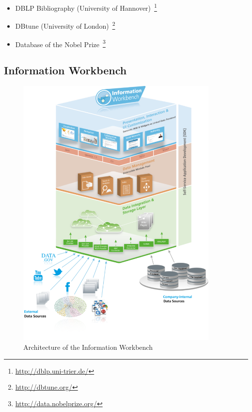 \begin{itemize}
\itemsep0pt
\item DBLP Bibliography (University of Hannover)~\footnote{\url{http://dblp.uni-trier.de/}}
\item DBtune (University of London)~\footnote{\url{http://dbtune.org/}}
\item Database of the Nobel Prize~\footnote{\url{http://data.nobelprize.org/}}
\end{itemize}

\subsection{Information Workbench}

\begin{figure}[htbp]
	\centering
\includegraphics[width=0.9\textwidth]{img/information_workbench_architecture.png}
	\caption{Architecture of the Information Workbench}
	\label{iw_architecture}
\end{figure}

